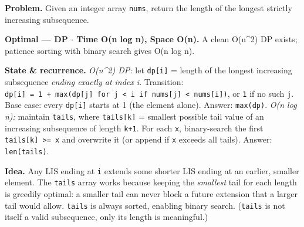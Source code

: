 \documentclass[11pt]{article}
\begin{document}
\textbf{Problem.} Given an integer array \texttt{nums}, return the length of the longest strictly increasing subsequence.

\textbf{Optimal --- DP \(\cdot\) Time O(n log n), Space O(n).} A clean O(n\^{}2) DP exists; patience sorting with binary search gives O(n log n).

\textbf{State \& recurrence.} \emph{O(n\^{}2) DP:} let \texttt{dp{[}i{]}} = length of the longest increasing subsequence \emph{ending exactly at index i}. Transition: \texttt{dp{[}i{]}\ =\ 1\ +\ max(dp{[}j{]}\ for\ j\ \textless{}\ i\ if\ nums{[}j{]}\ \textless{}\ nums{[}i{]})}, or \texttt{1} if no such \texttt{j}. Base case: every \texttt{dp{[}i{]}} starts at 1 (the element alone). Answer: \texttt{max(dp)}.
\emph{O(n log n):} maintain \texttt{tails}, where \texttt{tails{[}k{]}} = smallest possible tail value of an increasing subsequence of length \texttt{k+1}. For each \texttt{x}, binary-search the first \texttt{tails{[}k{]}\ \textgreater{}=\ x} and overwrite it (or append if \texttt{x} exceeds all tails). Answer: \texttt{len(tails)}.

\textbf{Idea.} Any LIS ending at \texttt{i} extends some shorter LIS ending at an earlier, smaller element. The \texttt{tails} array works because keeping the \emph{smallest} tail for each length is greedily optimal: a smaller tail can never block a future extension that a larger tail would allow. \texttt{tails} is always sorted, enabling binary search. (\texttt{tails} is not itself a valid subsequence, only its length is meaningful.)

\end{document}
